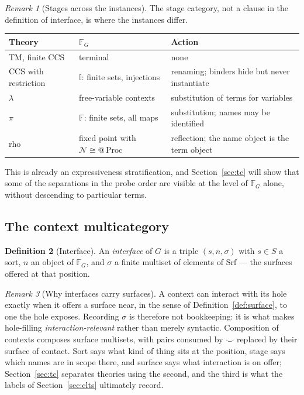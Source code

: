 \documentclass[11pt,a4paper]{article}
\theoremstyle{definition}
\newtheorem{definition}{Definition}[section]
\theoremstyle{plain}
\theoremstyle{remark}
\newtheorem{remark}[definition]{Remark}
\begin{document}
\begin{remark}[Stages across the instances]
\label{rem:stages}
The stage category, not a clause in the definition of interface, is where the
instances differ.

\begin{center}
\begin{tabular}{@{}llp{5.0cm}@{}}
\toprule
Theory & $\mathbb{F}_G$ & Action \\
\midrule
TM, finite CCS & terminal & none \\
CCS with restriction & $\mathbb{I}$: finite sets, injections & renaming; binders hide but never instantiate \\
$\lambda$ & free-variable contexts & substitution of terms for variables \\
$\pi$ & $\mathbb{F}$: finite sets, all maps & substitution; names may be identified \\
rho & fixed point with $\mathcal{N} \cong @\,\mathrm{Proc}$ & reflection; the name object is the term object \\
\bottomrule
\end{tabular}
\end{center}

This is already an expressiveness stratification, and Section~\ref{sec:tc} will
show that some of the separations in the probe order are visible at the level of
$\mathbb{F}_G$ alone, without descending to particular terms.
\end{remark}

\subsection{The context multicategory}

\begin{definition}[Interface]
\label{def:interface}
An \emph{interface} of $G$ is a triple $(s,n,\sigma)$ with $s \in S$ a sort, $n$ an
object of $\mathbb{F}_G$, and $\sigma$ a finite multiset of elements of
$\mathrm{Srf}$ --- the surfaces offered at that position.
\end{definition}

\begin{remark}[Why interfaces carry surfaces]
\label{rem:surfaceinterface}
A context can interact with its hole exactly when it offers a surface near, in the
sense of Definition~\ref{def:surface}, to one the hole exposes. Recording $\sigma$
is therefore not bookkeeping: it is what makes hole-filling
\emph{interaction-relevant} rather than merely syntactic. Composition of contexts
composes surface multisets, with pairs consumed by $\smile$ replaced by their
surface of contact. Sort says what kind of thing sits at the position, stage says
which names are in scope there, and surface says what interaction is on offer;
Section~\ref{sec:tc} separates theories using the second, and the third is what the
labels of Section~\ref{sec:clts} ultimately record.
\end{remark}
\end{document}
